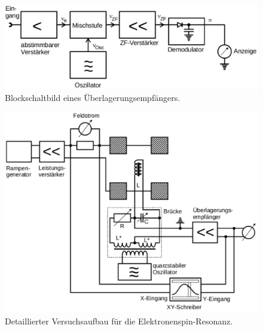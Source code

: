 \begin{figure}
  \centering
  \includegraphics[width=\textwidth]{picture/Überlagerungsempfänger.pdf}
  \caption{Blockschaltbild eines Überlagerungsempfängers. \cite{V28}}
  \label{fig:Überlagerungsempfänger}
\end{figure}

\newpage
\begin{figure}
  \centering
  \includegraphics[width=\linewidth]{picture/realerAufbau.pdf}
  \caption{Detaillierter Versuchsaufbau für die Elektronenspin-Resonanz. \cite{V28}}
  \label{fig:realerAufbau}
\end{figure}



